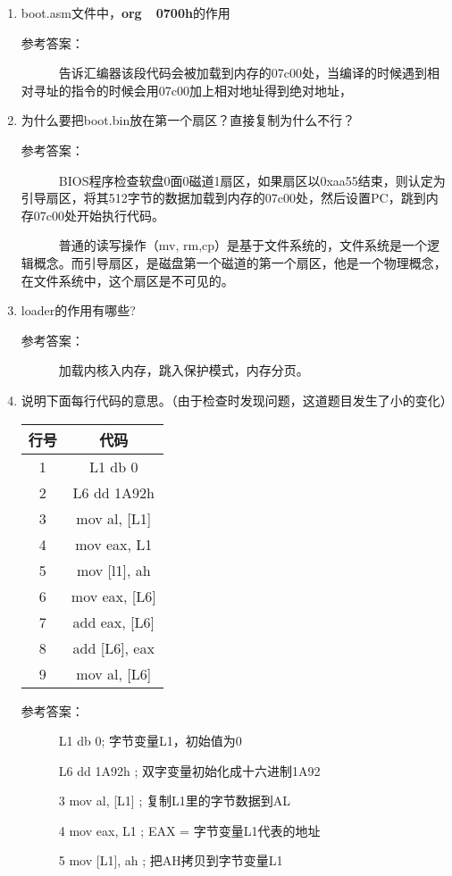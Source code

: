 \documentclass[a4paper]{article}
\begin{document}
\begin{enumerate}
	\item boot.asm文件中，\textbf{org~~0700h}的作用
	
	参考答案：
	
	~~~~~~告诉汇编器该段代码会被加载到内存的07c00处，当编译的时候遇到相对寻址的指令的时候会用07c00加上相对地址得到绝对地址，
	\item 为什么要把boot.bin放在第一个扇区？直接复制为什么不行？
	
	参考答案：
	
	~~~~~~BIOS程序检查软盘0面0磁道1扇区，如果扇区以0xaa55结束，则认定为引导扇区，将其512字节的数据加载到内存的07c00处，然后设置PC，跳到内存07c00处开始执行代码。
	
~~~~~~普通的读写操作（mv, rm,cp）是基于文件系统的，文件系统是一个逻辑概念。而引导扇区，是磁盘第一个磁道的第一个扇区，他是一个物理概念，在文件系统中，这个扇区是不可见的。
	\item loader的作用有哪些?
	
	参考答案：
	
	~~~~~~加载内核入内存，跳入保护模式，内存分页。
	
	\item 说明下面每行代码的意思。（由于检查时发现问题，这道题目发生了小的变化）

\begin{table}[hbp]
\centering
\begin{tabular}{cc}
行号 & 代码 \\\hline
1 & L1 db 0\\
2 & L6 dd 1A92h\\
3 & mov al, [L1] \\
4 & mov eax, L1 \\
5 & mov [l1], ah \\
6 & mov eax, [L6] \\
7 & add eax, [L6] \\
8 & add [L6], eax \\
9 & mov al, [L6]
\end{tabular}
\end{table}

参考答案：

~~~~~~L1 db 0; 字节变量L1，初始值为0

~~~~~~L6 dd 1A92h ; 双字变量初始化成十六进制1A92

~~~~~~3 mov al, [L1] ; 复制L1里的字节数据到AL

~~~~~~4 mov eax, L1 ; EAX = 字节变量L1代表的地址

~~~~~~5 mov [L1], ah ; 把AH拷贝到字节变量L1


\end{enumerate}
\end{document}
